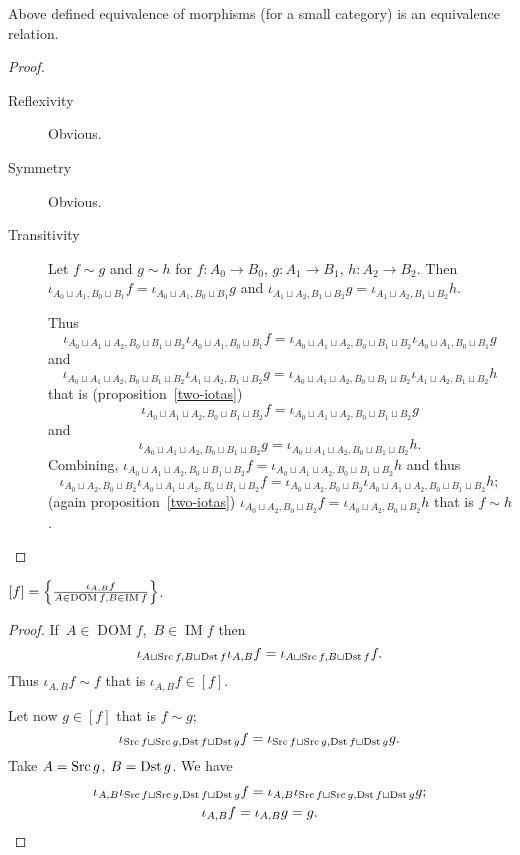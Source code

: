 \begin{prop}
Above defined equivalence of morphisms (for a small category)
is an equivalence relation.
\end{prop}

\begin{proof}
~
\begin{description}
\item[Reflexivity] Obvious.

\item[Symmetry] Obvious.

\item[Transitivity] Let $f\sim g$ and $g\sim h$ for
$f:A_0\to B_0$, $g:A_1\to B_1$, $h:A_2\to B_2$.
Then
$\iota_{A_0\sqcup A_1,B_0\sqcup B_1}f=\iota_{A_0\sqcup A_1,B_0\sqcup B_1}g$ and
$\iota_{A_1\sqcup A_2,B_1\sqcup B_2}g=\iota_{A_1\sqcup A_2,B_1\sqcup B_2}h$.

Thus
\[\iota_{A_0\sqcup A_1\sqcup A_2,B_0\sqcup B_1\sqcup B_2}\iota_{A_0\sqcup A_1,B_0\sqcup B_1}f=\iota_{A_0\sqcup A_1\sqcup A_2,B_0\sqcup B_1\sqcup B_2}\iota_{A_0\sqcup A_1,B_0\sqcup B_1}g\] and
\[\iota_{A_0\sqcup A_1\sqcup A_2,B_0\sqcup B_1\sqcup B_2}\iota_{A_1\sqcup A_2,B_1\sqcup B_2}g=\iota_{A_0\sqcup A_1\sqcup A_2,B_0\sqcup B_1\sqcup B_2}\iota_{A_1\sqcup A_2,B_1\sqcup B_2}h\]
that is (proposition~\ref{two-iotas})
\[\iota_{A_0\sqcup A_1\sqcup A_2,B_0\sqcup B_1\sqcup B_2}f=\iota_{A_0\sqcup A_1\sqcup A_2,B_0\sqcup B_1\sqcup B_2}g\]
and
\[\iota_{A_0\sqcup A_1\sqcup A_2,B_0\sqcup B_1\sqcup B_2}g=\iota_{A_0\sqcup A_1\sqcup A_2,B_0\sqcup B_1\sqcup B_2}h.\]
Combining,
$\iota_{A_0\sqcup A_1\sqcup A_2,B_0\sqcup B_1\sqcup B_2}f=\iota_{A_0\sqcup A_1\sqcup A_2,B_0\sqcup B_1\sqcup B_2}h$ and thus
\[\iota_{A_0\sqcup A_2,B_0\sqcup B_2}\iota_{A_0\sqcup A_1\sqcup A_2,B_0\sqcup B_1\sqcup B_2}f=\iota_{A_0\sqcup A_2,B_0\sqcup B_2}\iota_{A_0\sqcup A_1\sqcup A_2,B_0\sqcup B_1\sqcup B_2}h;\]
(again proposition~\ref{two-iotas}) $\iota_{A_0\sqcup A_2,B_0\sqcup B_2}f=\iota_{A_0\sqcup A_2,B_0\sqcup B_2}h$
that is $f\sim h$.
\end{description}
\end{proof}

\begin{prop}
$[f] = \left\{ \frac{\iota_{A,B}f}{
A\in\operatorname{DOM}f,B\in\operatorname{IM}f}\right\}$.
\end{prop}

\begin{proof}
If~$A\in\operatorname{DOM}f$,~$B\in\operatorname{IM}f$
then
\[\iota_{A\sqcup\operatorname{Src} f,B\sqcup\operatorname{Dst} f}\iota_{A,B}f =
\iota_{A\sqcup\operatorname{Src} f,B\sqcup\operatorname{Dst} f}f.\] Thus
$\iota_{A,B}f\sim f$ that is $\iota_{A,B}f\in[f]$.

Let now $g\in[f]$ that is $f\sim g$;
\[\iota_{\operatorname{Src} f\sqcup\operatorname{Src} g,\operatorname{Dst} f\sqcup\operatorname{Dst} g}f=
\iota_{\operatorname{Src} f\sqcup\operatorname{Src} g,\operatorname{Dst} f\sqcup\operatorname{Dst} g}g.\]
Take $A=\operatorname{Src} g$, $B=\operatorname{Dst} g$. We have
\begin{gather*}
\iota_{A,B}\iota_{\operatorname{Src} f\sqcup\operatorname{Src} g,\operatorname{Dst} f\sqcup\operatorname{Dst} g}f=
\iota_{A,B}\iota_{\operatorname{Src} f\sqcup\operatorname{Src} g,\operatorname{Dst} f\sqcup\operatorname{Dst} g}g;\\
\iota_{A,B}f=\iota_{A,B}g = g.
\end{gather*}
\end{proof}

